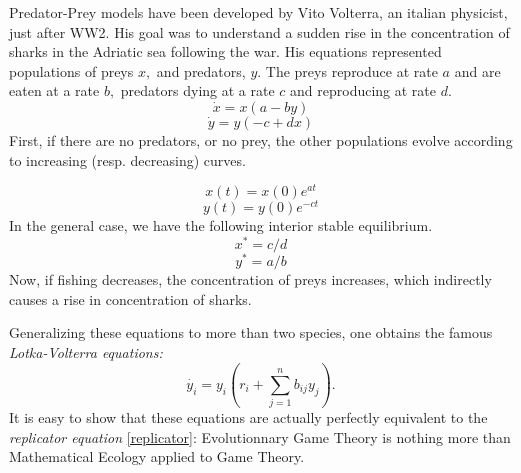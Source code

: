 Predator-Prey models have been developed by Vito Volterra, an italian physicist, just after WW2.  His goal was to understand a sudden rise in the concentration of sharks in the Adriatic sea following the war.  His equations represented populations of preys $x,$ and predators, $y.$  The preys reproduce at rate $a$ and are eaten at a rate $b,$ predators dying at a rate $c$ and reproducing at rate $d.$
\[\dot{x} = x(a-by)\]
\[\dot{y} = y(-c+dx)\]
First, if there are no predators, or no prey, the other populations evolve according to increasing (resp. decreasing) curves.

\[x(t)=x(0)e^{at}\]
\[y(t)=y(0)e^{-ct}\]
In the general case, we have the following interior stable equilibrium.
\[x^*=c/d\]
\[y^*=a/b\]
Now, if fishing decreases, the concentration of preys increases, which indirectly causes a rise in concentration of sharks.


Generalizing these equations to more than two species, one obtains the famous \emph{Lotka-Volterra equations:}
\[\dot{y_i}=y_i(r_i + \sum_{j=1}^n b_{ij}y_j).\]
It is easy to show that these equations are actually perfectly equivalent to the {\it{replicator equation}} \eqref{replicator}: Evolutionnary Game Theory is nothing more than Mathematical Ecology applied to Game Theory.
